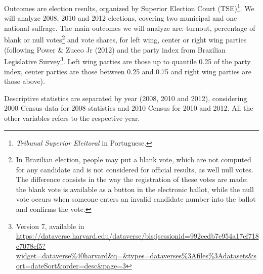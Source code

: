 \documentclass[
  12pt,
]{article}
\begin{document}
Outcomes are election results, organized by Superior Election Court
(TSE)\footnote{\emph{Tribunal Superior Eleitoral} in Portuguese.}. We
will analyze 2008, 2010 and 2012 elections, covering two municipal and
one national suffrage. The main outcomes we will analyze are: turnout,
percentage of blank or null votes\footnote{In Brazilian election, people
  may put a blank vote, which are not computed for any candidate and is
  not considered for official results, as well null votes. The
  difference consists in the way the registration of these votes are
  made: the blank vote is available as a button in the electronic
  ballot, while the null vote occurs when someone enters an invalid
  candidate number into the ballot and confirms the vote.} and vote
shares, for left wing, center or right wing parties (following Power \&
Zucco Jr (2012) and the party index from Brazilian Legislative
Survey\footnote{Version 7, available in
  \url{https://dataverse.harvard.edu/dataverse/bls;jsessionid=992eedb7e954a17ef718c7078cf5?widget=dataverse\%40harvard\&q=\&types=dataverses\%3Afiles\%3Adatasets\&sort=dateSort\&order=desc\&page=3}}.
Left wing parties are those up to quantile 0.25 of the party index,
center parties are those between 0.25 and 0.75 and right wing parties
are those above).

Descriptive statistics are separated by year (2008, 2010 and 2012),
considering 2000 Census data for 2008 statistics and 2010 Census for
2010 and 2012. All the other variables refers to the respective year.
\end{document}
